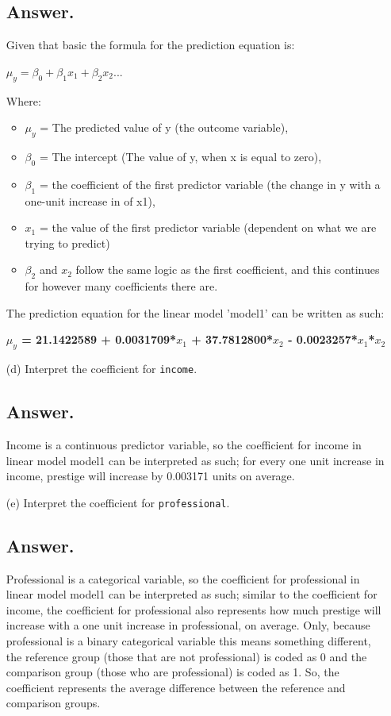 \documentclass[12pt,letterpaper]{article}
\begin{document}
\begin{enumerate}
	\subsection*{Answer.}
	Given that basic the formula for the prediction equation is:
	
	\vspace{0.1cm}
	
		$\mu_y = \beta_0 + \beta_1 x_1 + \beta_2 x_2$...
		
	\vspace{0.1cm}
	
	Where:
	\begin{itemize}
	\item $\mu_y$ = The predicted value of y (the outcome variable), 
	\item $\beta_0$ = The intercept (The value of y, when x is equal to zero), 
	\item $\beta_1$ = the coefficient of the first predictor variable (the change in y with a one-unit increase in of x1), 
	\item $x_1$ = the value of the first predictor variable (dependent on what we are trying to predict) 
	\item $\beta_2$ and $x_2$ follow the same logic as the first coefficient, and this continues for however many coefficients there are. 
	\end{itemize}
	\vspace{0.1cm}
	
	The prediction equation for the linear model 'model1' can be written as such:
	
	\vspace{0.1cm}
	
	\textbf{$\mu_y$ = 21.1422589 + 0.0031709*$x_1$ + 37.7812800*$x_2$ - 0.0023257*$x_1$*$x_2$}
\newpage
	\item [(d)]
	Interpret the coefficient for \texttt{income}.
	\subsection*{Answer.}
	Income is a continuous predictor variable, so the coefficient for income in linear model model1 can be interpreted as such; for every one unit increase in income, prestige will increase by 0.003171 units on average.  
	\vspace{10cm}	
	\item [(e)]
	Interpret the coefficient for \texttt{professional}.
	\subsection*{Answer.}
	Professional is a categorical variable, so the coefficient for professional in linear model model1 can be interpreted as such; similar to the coefficient for income, the coefficient for professional also represents how much prestige will increase with a one unit increase in professional, on average. Only, because professional is a binary categorical variable this means something different, the reference group (those that are not professional) is coded as 0 and the comparison group (those who are professional) is coded as 1. So, the coefficient represents the average difference between the reference and comparison groups.
	

\end{enumerate}
\end{document}
